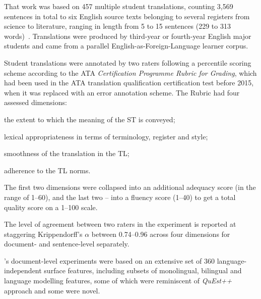 That work was based on 457 multiple student translations, counting 3,569 sentences in total to six English source texts belonging to several registers from science to literature, ranging in length from 5 to 15 sentences (229 to 313 words)~\cite{Yuan2018}. Translations were produced by third-year or fourth-year English major students and came from a parallel English-as-Foreign-Language learner corpus.

Student translations were annotated by two raters following a percentile scoring scheme according to the \gls{ATA} \textit{Certification Programme Rubric for Grading}, which had been used in the ATA translation qualification certification test before 2015, when it was replaced with an error annotation scheme. The Rubric had four assessed dimensions:

\begin{description}\compresslist{}
	\item [1. usefulness] the extent to which the meaning of the ST is conveyed;
	\item [2. terminology] lexical appropriateness in terms of terminology, register and style;
	\item [3. idiomatic writing] smoothness of the translation in the TL;
	\item [4. target mechanics] adherence to the TL norms.
\end{description}

The first two dimensions were collapsed into an additional adequacy score (in the range of 1--60), and the last two -- into a fluency score (1--40) to get a total quality score on a 1--100 scale.

\label{pg:reliability_res1}
The level of agreement between two raters in the experiment is reported at staggering Krippendorff's $\alpha$ between 0.74--0.96 across four dimensions for document- and sentence-level separately.

\citeauthor{Yuan2018}'s \citeyear{Yuan2018} document-level experiments were based on an extensive set of 360 language-independent surface features, including subsets of monolingual, bilingual and language modelling features, some of which were reminiscent of \textit{QuEst++} approach and some were novel.

